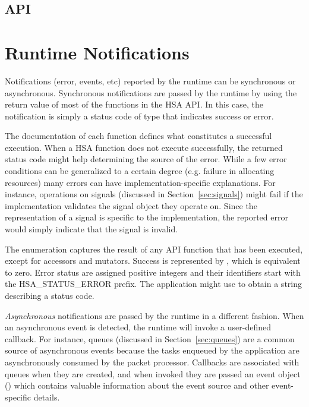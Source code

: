 \documentclass[final]{book}
\newcommand{\reftyp}[1]{#1}
\newcommand{\refenu}[1]{\reftyp{#1}}
\begin{document}
\subsection{API}


\section{Runtime Notifications}
\label{sec:error}

Notifications (error, events, etc) reported by the runtime can be synchronous or
asynchronous. Synchronous notifications are passed by the runtime by using the
return value of most of the functions in the HSA API. In this case, the
notification is simply a status code of type  that
indicates success or error.

The documentation of each function defines what constitutes a successful
execution. When a HSA function does not execute successfully, the returned
status code might help determining the source of the error. While a few error
conditions can be generalized to a certain degree (e.g. failure in allocating
resources) many errors can have implementation-specific explanations. For
instance, operations on signals (discussed in Section~\ref{sec:signals}) might
fail if the implementation validates the signal object they operate on. Since
the representation of a signal is specific to the implementation, the reported
error would simply indicate that the signal is invalid.

The  enumeration captures the result of any API function
that has been executed, except for accessors and mutators. Success is
represented by , which is equivalent to zero. Error
status are assigned positive integers and their identifiers start with the
\refenu{HSA_STATUS_ERROR} prefix. The application might use
 to obtain a string describing a status code.

\textit{Asynchronous} notifications are passed by the runtime in a different
fashion. When an asynchronous event is detected, the runtime will invoke a
user-defined callback. For instance, queues (discussed in
Section~\ref{sec:queues}) are a common source of asynchronous events because the
tasks enqueued by the application are asynchronously consumed by the packet
processor. Callbacks are associated with queues when they are created, and when
invoked they are passed an event object () which contains
valuable information about the event source and other event-specific details.
\end{document}
